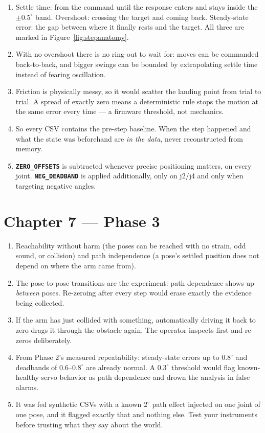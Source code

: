 \documentclass[11pt,twoside,openright]{book}
\newcommand{\code}[1]{\texttt{\bfseries #1}}
\begin{document}
\begin{enumerate}
  \item Settle time: from the command until the response enters and
    stays inside the $\pm0.5^\circ$ band. Overshoot: crossing the target
    and coming back. Steady-state error: the gap between where it
    finally rests and the target. All three are marked in
    Figure~\ref{fig:stepanatomy}.
  \item With no overshoot there is no ring-out to wait for: moves can be
    commanded back-to-back, and bigger swings can be bounded by
    extrapolating settle time instead of fearing oscillation.
  \item Friction is physically messy, so it would scatter the landing
    point from trial to trial. A spread of exactly zero means a
    deterministic rule stops the motion at the same error every time ---
    a firmware threshold, not mechanics.
  \item So every CSV contains the pre-step baseline. When the step
    happened and what the state was beforehand are \emph{in the data},
    never reconstructed from memory.
  \item \code{ZERO\_OFFSETS} is subtracted whenever precise positioning
    matters, on every joint. \code{NEG\_DEADBAND} is applied additionally,
    only on j2/j4 and only when targeting negative angles.
\end{enumerate}

\section{Chapter 7 --- Phase 3}

\begin{enumerate}
  \item Reachability without harm (the poses can be reached with no
    strain, odd sound, or collision) and path independence (a pose's
    settled position does not depend on where the arm came from).
  \item The pose-to-pose transitions are the experiment: path dependence
    shows up \emph{between} poses. Re-zeroing after every step would
    erase exactly the evidence being collected.
  \item If the arm has just collided with something, automatically
    driving it back to zero drags it through the obstacle again. The
    operator inspects first and re-zeros deliberately.
  \item From Phase 2's measured repeatability: steady-state errors up to
    $0.8^\circ$ and deadbands of $0.6$--$0.8^\circ$ are already normal.
    A $0.3^\circ$ threshold would flag known-healthy servo behavior as
    path dependence and drown the analysis in false alarms.
  \item It was fed synthetic CSVs with a known $2^\circ$ path effect
    injected on one joint of one pose, and it flagged exactly that and
    nothing else. Test your instruments before trusting what they say
    about the world.
\end{enumerate}
\end{document}
